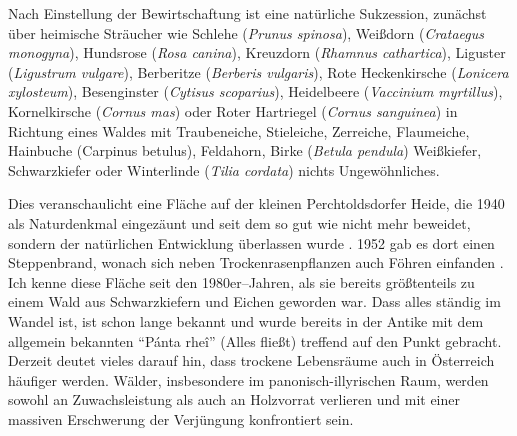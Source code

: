 \documentclass[twocolumn]{scrartcl}
\begin{document}
Nach Einstellung der Bewirtschaftung ist eine natürliche Sukzession,
zunächst über heimische Sträucher wie Schlehe (\emph{Prunus spinosa}),
Weißdorn (\emph{Crataegus monogyna}), Hundsrose (\emph{Rosa canina}),
Kreuzdorn (\emph{Rhamnus cathartica}), Liguster (\emph{Ligustrum
vulgare}), Berberitze (\emph{Berberis vulgaris}), Rote Heckenkirsche
(\emph{Lonicera xylosteum}), Besenginster (\emph{Cytisus scoparius}),
Heidelbeere (\emph{Vaccinium myrtillus}), Kornelkirsche (\emph{Cornus
mas}) oder Roter Hartriegel (\emph{Cornus sanguinea}) in Richtung
eines Waldes mit Traubeneiche, Stieleiche, Zerreiche, Flaumeiche,
Hainbuche (Carpinus betulus), Feldahorn, Birke (\emph{Betula pendula})
Weißkiefer, Schwarzkiefer oder Winterlinde (\emph{Tilia cordata})
nichts Ungewöhnliches.

Dies veranschaulicht eine Fläche auf der kleinen Perchtoldsdorfer
Heide, die 1940 als Naturdenkmal eingezäunt und seit dem so gut wie
nicht mehr beweidet, sondern der natürlichen Entwicklung überlassen
wurde \citep{rosenkranz1953heide}. 1952 gab es dort einen
Steppenbrand, wonach sich neben Trockenrasenpflanzen auch Föhren
einfanden \citep{rosenkranz1953heideBrand}. Ich kenne diese Fläche
seit den 1980er--Jahren, als sie bereits größtenteils zu einem Wald
aus Schwarzkiefern und Eichen geworden war.  Dass alles ständig im
Wandel ist, ist schon lange bekannt und wurde bereits in der Antike
mit dem allgemein bekannten \enquote{Pánta rheî} (Alles fließt)
treffend auf den Punkt gebracht.  Derzeit deutet vieles darauf hin,
dass trockene Lebensräume auch in Österreich häufiger werden. Wälder,
insbesondere im panonisch-illyrischen Raum, werden sowohl an
Zuwachsleistung als auch an Holzvorrat verlieren und mit einer
massiven Erschwerung der Verjüngung konfrontiert sein.
\end{document}

